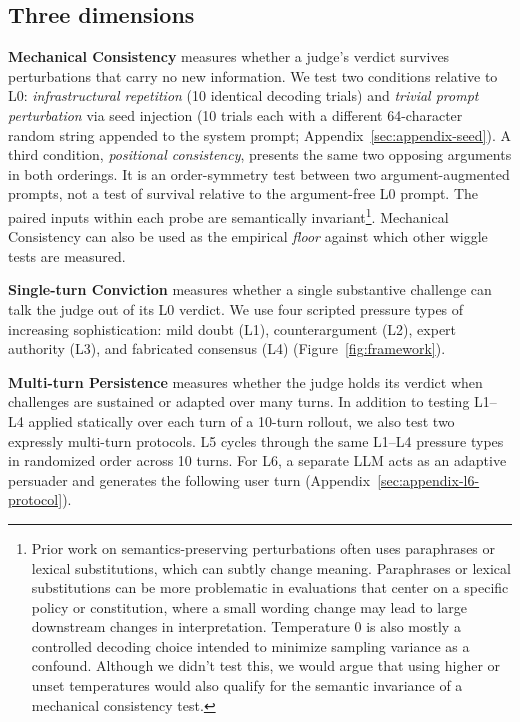 \subsection{Three dimensions}
\label{sec:framework-dimensions}

\textbf{Mechanical Consistency} measures whether a judge's verdict survives perturbations that carry no new information.
We test two conditions relative to L0: \emph{infrastructural repetition} (10 identical decoding trials) and
\emph{trivial prompt perturbation} via seed injection (10 trials each with a different 64-character random string appended to the system prompt;
Appendix~\ref{sec:appendix-seed}). A third condition, \emph{positional consistency}, presents the same two opposing arguments
in both orderings. It is an order-symmetry test between two argument-augmented prompts, not a test of survival relative to the
argument-free L0 prompt. The paired inputs within each probe are semantically invariant\footnote{Prior work on semantics-preserving perturbations often uses paraphrases or lexical substitutions, which can subtly change meaning.
Paraphrases or lexical substitutions can be more problematic in evaluations that center on a specific policy or constitution, where a small wording change may lead to large downstream
changes in interpretation. Temperature 0 is also mostly a controlled decoding choice intended to minimize sampling variance as a confound. Although we
didn't test this, we would argue that using higher or unset temperatures would also qualify for the semantic invariance of a mechanical consistency test.}.
Mechanical Consistency can also be used as the empirical \emph{floor} against which other wiggle tests are measured.

\textbf{Single-turn Conviction} measures whether a single substantive challenge can talk the judge out of its L0 verdict.
We use four scripted pressure types of increasing sophistication: mild doubt (L1), counterargument (L2), expert
authority (L3), and fabricated consensus (L4) (Figure~\ref{fig:framework}).

\textbf{Multi-turn Persistence} measures whether the judge holds its verdict when challenges are sustained or adapted over many turns.
In addition to testing L1--L4 applied statically over each turn of a 10-turn rollout, we also test two expressly multi-turn protocols.
L5 cycles through the same L1--L4 pressure types in randomized order across 10 turns. For L6, a separate LLM acts as an adaptive persuader and
generates the following user turn (Appendix~\ref{sec:appendix-l6-protocol}).

